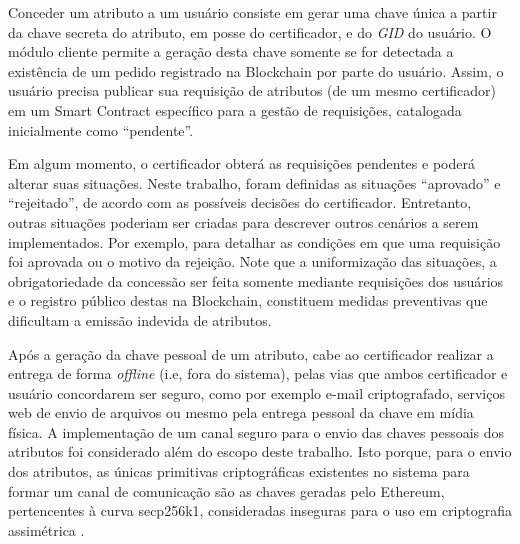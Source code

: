 \documentclass[a4paper,11pt]{article}
\begin{document}

Conceder um atributo a um usuário consiste em gerar uma chave única a partir da chave secreta do atributo, em posse do certificador, e do \emph{GID} do usuário.
O módulo cliente permite a geração desta chave somente se for detectada a existência de um pedido registrado na Blockchain por parte do usuário.
Assim, o usuário precisa publicar sua requisição de atributos (de um mesmo certificador) em um Smart Contract específico para a gestão de requisições, catalogada inicialmente como ``pendente''. %

Em algum momento, o certificador obterá as requisições pendentes e poderá alterar suas situações. %
Neste trabalho, foram definidas as situações ``aprovado'' e ``rejeitado'', de acordo com as possíveis decisões do certificador. Entretanto, outras situações poderiam ser criadas para descrever outros cenários a serem implementados. Por exemplo, para detalhar as condições em que uma requisição foi aprovada ou o motivo da rejeição. Note que a uniformização das situações, a obrigatoriedade da concessão ser feita somente mediante requisições dos usuários e o registro público destas na Blockchain, constituem medidas preventivas que dificultam a emissão indevida de atributos. %

Após a geração da chave pessoal de um atributo, cabe ao certificador realizar a entrega de forma \emph{offline} (i.e, fora do sistema), pelas vias que ambos certificador e usuário concordarem ser seguro, como por exemplo e-mail criptografado, serviços web de envio de arquivos ou mesmo pela entrega pessoal da chave em mídia física. A implementação de um canal seguro para o envio das chaves pessoais dos atributos foi considerado além do escopo deste trabalho. Isto porque, para o envio dos atributos, as únicas primitivas criptográficas existentes no sistema para formar um canal de comunicação são as chaves geradas pelo Ethereum, pertencentes à curva secp256k1, consideradas inseguras para o uso em criptografia assimétrica \cite{Bernstein2017}. %
\end{document}
